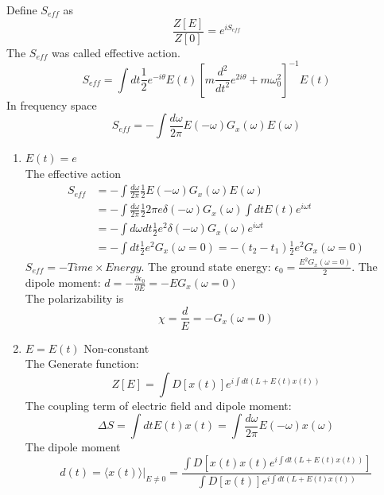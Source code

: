 \documentclass[a4paper,11pt]{article}
\begin{document}
Define $S_{eff}$ as
\begin{equation*}
  \frac{Z[E]}{Z[0]}=e^{iS_{eff}}
\end{equation*}
The $S_{eff}$ was called effective action.
\begin{equation*}
  S_{eff}=\int dt \frac{1}{2}e^{-i\theta}E(t)\left[m\frac{d^2}{dt^2}e^{2i\theta}+m\omega_0^2\right]^{-1}E(t)
\end{equation*}
In frequency space
\begin{equation*}
  S_{eff}=-\int \frac{d\omega}{2\pi}E(-\omega)G_x(\omega)E(\omega)
\end{equation*}
\begin{enumerate}
  \item $E(t)=e$\\
  The effective action
  \begin{equation*}
    \begin{split}
       S_{eff}&=-\int \frac{d\omega}{2\pi}\frac{1}{2}E(-\omega)G_x(\omega)E(\omega)\\
         &=-\int\frac{d\omega}{2\pi}\frac{1}{2}2\pi e\delta(-\omega)G_x(\omega)\int dt E(t)e^{i\omega t}\\
         &=-\int d\omega dt\frac{1}{2}e^2\delta(-\omega)G_x(\omega)e^{i\omega t}\\
         &=-\int dt\frac{1}{2}e^2G_x(\omega=0)=-(t_2-t_1)\frac{1}{2}e^2G_x(\omega=0)
    \end{split}
  \end{equation*}
  $S_{eff}=-Time\times Energy$. The ground state energy: $\epsilon_0=\frac{E^2G_x(\omega=0)}{2}$. The dipole moment: $d=-\frac{\partial\epsilon_0}{\partial E}=-EG_x(\omega=0)$\\
  The polarizability is
  \begin{equation*}
    \chi=\frac{d}{E}=-G_x(\omega=0)
  \end{equation*}
  \item $E=E(t)$ Non-constant\\
  The Generate function:
  \begin{equation*}
    Z[E]=\int D[x(t)]e^{i\int dt(L+E(t)x(t))}
  \end{equation*}
  The coupling term of electric field and dipole moment:
  \begin{equation*}
    \Delta S=\int dtE(t)x(t)=\int\frac{d\omega}{2\pi}E(-\omega)x(\omega)
  \end{equation*}
  The dipole moment
  \begin{equation*}
    \left.d(t)=\langle x(t)\rangle\right|_{E\neq0}=\frac{\int D[x(t)x(t)e^{i\int dt(L+E(t)x(t))}]}{\int D[x(t)]e^{i\int dt(L+E(t)x(t))}}

\end{equation*}
\end{enumerate}
\end{document}
